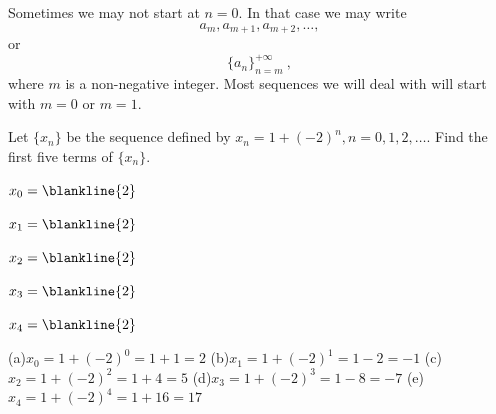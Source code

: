 \begin{rem}
Sometimes we may not start at $n = 0$. In that case we may write
$$a_m, a_{m+1}, a_{m+2}, \ldots,$$ 
or
$$ \{a_n\}_{n=m} ^{+\infty}\ ,$$
where $m$ is a non-negative integer.  
Most sequences we will deal with will start with $m=0$ or $m=1$.
\end{rem}

\begin{exer}
Let $\{x_n\}$ be the sequence defined by $x_n = 1 + (-2)^n, n = 0, 1, 2, \ldots$.
Find the first five terms of $\{x_n\}$.
\begin{lenum}
\item $x_0=\blankline{2}$
\item $x_1=\blankline{2}$
\item $x_2=\blankline{2}$
\item $x_3=\blankline{2}$
\item $x_4=\blankline{2}$
\end{lenum}
\begin{answer}
 (a)$x_0=1+(-2)^0 = 1 + 1 = 2$
 (b)$x_1=1+(-2)^1 = 1-2=-1$
 (c)$x_2=1+(-2)^2=1+4= 5$
 (d)$x_3=1+(-2)^3=1-8=-7$
 (e)$x_4=1+(-2)^4=1+16=17$
\end{answer}
\end{exer}

